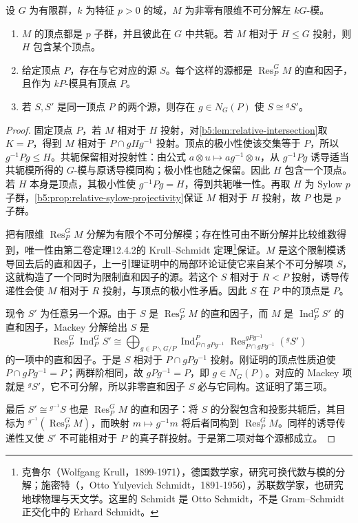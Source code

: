 \begin{theorem}\label{b5:thm:vertices-sources}
	设 \(G\) 为有限群，\(k\) 为特征 \(p>0\) 的域，\(M\) 为非零有限维不可分解左 \(kG\)-模。
	\begin{enumerate}
		\item \(M\) 的顶点都是 \(p\) 子群，并且彼此在 \(G\) 中共轭。若 \(M\) 相对于 \(H\le G\) 投射，则 \(H\) 包含某个顶点。
		\item 给定顶点 \(P\)，存在与它对应的源 \(S\)。每个这样的源都是 \(\operatorname{Res}_P^G M\) 的直和因子，且作为 \(kP\)-模具有顶点 \(P\)。
		\item 若 \(S,S'\) 是同一顶点 \(P\) 的两个源，则存在 \(g\in N_G(P)\) 使 \(S\cong{}^gS'\)。
	\end{enumerate}
\end{theorem}
\begin{proof}
	固定顶点 \(P\)，若 \(M\) 相对于 \(H\) 投射，对\cref{b5:lem:relative-intersection}取 \(K=P\)，得到 \(M\) 相对于 \(P\cap gHg^{-1}\) 投射。顶点的极小性使该交集等于 \(P\)，所以 \(g^{-1}Pg\le H\)。共轭保留相对投射性：由公式 \(a\otimes u\mapsto ag^{-1}\otimes u\)，从 \(g^{-1}Pg\) 诱导适当共轭模所得的 \(G\)-模与原诱导模同构；极小性也随之保留。因此 \(H\) 包含一个顶点。若 \(H\) 本身是顶点，其极小性使 \(g^{-1}Pg=H\)，得到共轭唯一性。再取 \(H\) 为 Sylow \(p\) 子群，\cref{b5:prop:relative-sylow-projectivity}保证 \(M\) 相对于 \(H\) 投射，故 \(P\) 也是 \(p\) 子群。

	把有限维 \(\operatorname{Res}_P^G M\) 分解为有限个不可分解模；存在性可由不断分解并比较维数得到，唯一性由第二卷定理12.4.2的 Krull--Schmidt 定理\footnote{克鲁尔（Wolfgang Krull，1899-1971），德国数学家，研究可换代数与模的分解；施密特（，Otto Yulyevich Schmidt，1891-1956），苏联数学家，也研究地球物理与天文学。这里的 Schmidt 是 Otto Schmidt，不是 Gram--Schmidt 正交化中的 Erhard Schmidt。}保证。\(M\) 是这个限制模诱导回去后的直和因子，上一引理证明中的局部环论证使它来自某个不可分解项 \(S\)，这就构造了一个同时为限制直和因子的源。若这个 \(S\) 相对于 \(R<P\) 投射，诱导传递性会使 \(M\) 相对于 \(R\) 投射，与顶点的极小性矛盾。因此 \(S\) 在 \(P\) 中的顶点是 \(P\)。

	现令 \(S'\) 为任意另一个源。由于 \(S\) 是 \(\operatorname{Res}_P^G M\) 的直和因子，而 \(M\) 是 \(\operatorname{Ind}_P^G S'\) 的直和因子，Mackey 分解给出 \(S\) 是
	\[
		\operatorname{Res}_P^G\operatorname{Ind}_P^G S'
		\cong\bigoplus_{g\in P\backslash G/P}
		\operatorname{Ind}_{P\cap gPg^{-1}}^P
		\operatorname{Res}_{P\cap gPg^{-1}}^{gPg^{-1}}({}^gS')
	\]
	的一项中的直和因子。于是 \(S\) 相对于 \(P\cap gPg^{-1}\) 投射。刚证明的顶点性质迫使 \(P\cap gPg^{-1}=P\)；两群阶相同，故 \(gPg^{-1}=P\)，即 \(g\in N_G(P)\)。对应的 Mackey 项就是 \({}^gS'\)，它不可分解，所以非零直和因子 \(S\) 必与它同构。这证明了第三项。

	最后 \(S'\cong{}^{g^{-1}}S\) 也是 \(\operatorname{Res}_P^G M\) 的直和因子：将 \(S\) 的分裂包含和投影共轭后，其目标为 \({}^{g^{-1}}(\operatorname{Res}_P^G M)\)，而映射 \(m\mapsto g^{-1}m\) 将后者同构到 \(\operatorname{Res}_P^G M\)。同样的诱导传递性又使 \(S'\) 不可能相对于 \(P\) 的真子群投射。于是第二项对每个源都成立。
\end{proof}

